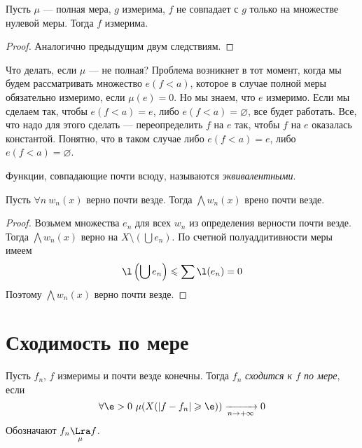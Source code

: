 \begin{corollary}
	Пусть $\mu$ --- полная мера, $g$ измерима, $f$ не совпадает с 
	$g$ только на множестве нулевой меры. Тогда $f$ измерима.
\end{corollary}
\begin{proof}
	Аналогично предыдущим двум следствиям.
\end{proof}

\begin{remark}
	Что делать, если $\mu$ --- не полная? Проблема возникнет в тот момент, 
	когда мы будем рассматривать множество $e(f < a)$, которое в случае
	полной меры обязательно измеримо, если $\mu(e) = 0$. Но мы знаем,
	что $e$ измеримо. Если мы сделаем так, чтобы $e(f < a) = e$, либо $e(f < a) = 
	\varnothing$, все будет работать. Все, что надо для этого сделать --- 
	переопределить $f$ на $e$ так, чтобы $f$ на $e$ оказалась константой.
	Понятно, что в таком случае либо $e(f < a) = e$, либо $e(f < a) = \varnothing$.
\end{remark}

\begin{definition}
	Функции, совпадающие почти всюду, называются \textit{эквивалентными}.
\end{definition}

\begin{theorem}
	Пусть $\forall n~ w_n(x)$ верно почти везде. Тогда 
	$\bigwedge{w_n(x)}$ врено почти везде.
\end{theorem}
\begin{proof}
	Возьмем множества $e_n$ для всех $w_n$ из определения верности почти везде.
	Тогда $\bigwedge{w_n(x)}$ верно на $\displaystyle X \setminus 
	\left(\bigcup{e_n}\right)$. По счетной полуаддитивности меры имеем
\[
	\l\left(\bigcup{e_n}\right) \leqslant \sum{\l(e_n)} = 0
\]
	Поэтому $\bigwedge{w_n(x)}$ верно почти везде.
\end{proof}

\section{Сходимость по мере}

\begin{definition}
	Пусть $f_n$, $f$ измеримы и почти везде конечны. Тогда 
	$f_n$ \textit{сходится к $f$ по мере}, если
\[
	\forall \e > 0~ \mu(X(|f - f_n| \geqslant \e)) \xrightarrow[n \to +\infty]{} 0
\]
	Обозначают $f_n \underset{\mu}{\Lra} f$.
\end{definition}

